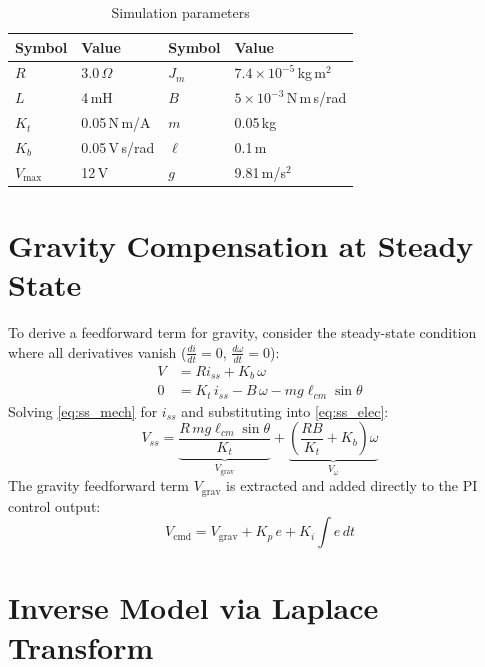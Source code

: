 \documentclass[10pt,twocolumn]{article}
\begin{document}
\begin{table}[h]
\centering
\caption{Simulation parameters}
\label{tab:params}
\begin{tabular}{llll}
\toprule
\textbf{Symbol} & \textbf{Value} & \textbf{Symbol} & \textbf{Value}\\
\midrule
$R$   & 3.0\,$\Omega$       & $J_m$  & $7.4\times10^{-5}$\,kg\,m$^2$\\
$L$   & 4\,mH               & $B$    & $5\times10^{-3}$\,N\,m\,s/rad\\
$K_t$ & 0.05\,N\,m/A        & $m$    & 0.05\,kg\\
$K_b$ & 0.05\,V\,s/rad      & $\ell$ & 0.1\,m\\
$V_{\max}$ & 12\,V          & $g$    & 9.81\,m/s$^2$\\
\bottomrule
\end{tabular}
\end{table}

\section{Gravity Compensation at Steady State}

To derive a feedforward term for gravity, consider the steady-state
condition where all derivatives vanish
($\frac{di}{dt}=0$,\; $\frac{d\omega}{dt}=0$):
\begin{align}
  V &= Ri_{ss} + K_b\,\omega \label{eq:ss_elec}\\
  0 &= K_t\,i_{ss} - B\,\omega - mg\ell_{cm}\sin\theta \label{eq:ss_mech}
\end{align}
Solving \eqref{eq:ss_mech} for $i_{ss}$ and substituting into
\eqref{eq:ss_elec}:
\begin{equation}
  V_{ss} = \underbrace{\frac{R\,mg\ell_{cm}\sin\theta}{K_t}}_{V_{\mathrm{grav}}}
           + \underbrace{\left(\frac{RB}{K_t}+K_b\right)\omega}_{V_{\omega}}
  \label{eq:vss}
\end{equation}
The gravity feedforward term $V_{\mathrm{grav}}$ is extracted and added
directly to the PI control output:
\begin{equation}
  V_{\mathrm{cmd}} = V_{\mathrm{grav}} + K_p\,e + K_i\!\int\! e\,dt
  \label{eq:pi_grav}
\end{equation}

\section{Inverse Model via Laplace Transform}
\end{document}
